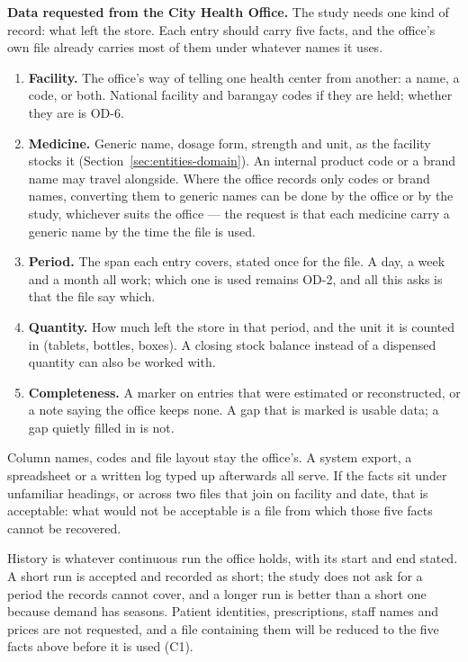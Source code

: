 \noindent\textbf{Data requested from the City Health Office.} The study needs one kind of record:
what left the store. Each entry should carry five facts, and the
office's own file already carries most of them under whatever names it uses.

\begin{enumerate}[leftmargin=1.6em,itemsep=0.25em]
  \item \textbf{Facility.} The office's way of telling one health center from another: a name, a
        code, or both. National facility and barangay codes if they are held; whether they are is
        OD-6.
  \item \textbf{Medicine.} Generic name, dosage form, strength and unit, as the facility stocks it
        (Section~\ref{sec:entities-domain}). An internal product code or a brand name may travel
        alongside. Where the office records only codes or brand names, converting them to generic
        names can be done by the office or by the study, whichever suits the office --- the request
        is that each medicine carry a generic name by the time the file is used.
  \item \textbf{Period.} The span each entry covers, stated once for the file. A day, a week and a
        month all work; which one is used remains OD-2, and all this asks is that the file say which.
  \item \textbf{Quantity.} How much left the store in that period, and the unit it is counted in
        (tablets, bottles, boxes). A closing stock balance instead of a dispensed quantity can also
        be worked with.
  \item \textbf{Completeness.} A marker on entries that were estimated or reconstructed, or a note
        saying the office keeps none. A gap that is marked is usable data; a gap quietly filled in
        is not.
\end{enumerate}

\noindent
Column names, codes and file layout stay the office's. A system export, a spreadsheet or a written
log typed up afterwards all serve. If the facts sit under unfamiliar headings, or across two files
that join on facility and date, that is acceptable: what would not be acceptable is a file from
which those five facts cannot be recovered.

\noindent
History is whatever continuous run the office holds, with its start and end stated. A short run is
accepted and recorded as short; the study does not ask for a period the records cannot cover, and a
longer run is better than a short one because demand has seasons. Patient identities, prescriptions,
staff names and prices are not requested, and a file containing them will be reduced to the five
facts above before it is used (C1).

